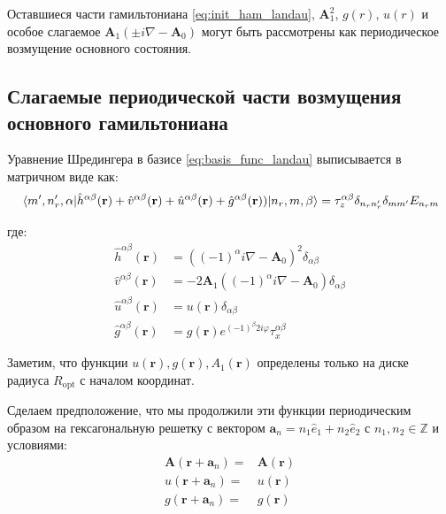 \documentclass[a4paper,article,14pt]{extarticle}
\begin{document}
Оставшиеся части гамильтониана \eqref{eq:init_ham_landau}, $\mathbf{A}_1^2$, $g(r)$, $u(r)$ и особое слагаемое 
$\mathbf{A}_1  (\pm i \nabla - \mathbf{A}_0 )$ могут быть рассмотрены как периодическое возмущение основного состояния.


\subsection{Слагаемые периодической части возмущения основного гамильтониана}

Уравнение Шредингера в базисе \eqref{eq:basis_func_landau} выписывается в матричном виде как:
\begin{equation}
\label{eq:shred_final}
\mel{m', n'_r, \alpha}{\hat h^{\alpha \beta}(\mathbf{r}) + \hat v^{\alpha \beta}(\mathbf{r}) + \hat u^{\alpha \beta}(\mathbf{r}) + \hat g^{\alpha \beta} (\mathbf{r})) }{n_r,m, \beta} = {\tau_z^{\alpha \beta} \delta_{n_r n'_r} \delta_{m m'} E_{n_r m} }
\end{equation}

\noindent где:
\begin{equation}
\label{eq:definitions}
\begin{aligned}
\hat h^{\alpha \beta}(\mathbf{r})   &= \left( (-1)^\alpha i \nabla - \mathbf{A}_0 \right) ^ 2 \delta_{\alpha \beta} \\
\hat v^{\alpha \beta}(\mathbf{r})   &= - 2 \mathbf{A}_1 \left( (-1)^{\alpha} i \nabla - \mathbf{A}_0 \right) \delta_{\alpha \beta} \\
\hat u^{\alpha \beta}(\mathbf{r})   &= u(\mathbf{r})  \delta_{\alpha \beta}\\
\hat g^{\alpha \beta} (\mathbf{r}) &=   g(\mathbf{r})  e^{ (-1)^{\beta} 2  i   \varphi} \tau^{\alpha \beta}_x 
\end{aligned}
\end{equation}

Заметим, что функции $u(\mathbf{r}), g(\mathbf{r}), A_1(\mathbf{r})$ определены только на диске радиуса $R_\text{opt}$ с началом координат.

Сделаем предположение, что мы продолжили эти функции периодическим образом на гексагональную решетку с вектором $\mathbf{a}_n = n_1 \hat {e}_1 + n_2 \hat {e}_2$ с $n_1,n_2 \in \mathbb{Z}$ и условиями:
\begin{equation}
\label{eq:periodic_potentials}
\begin{aligned}
\mathbf{A}(\mathbf{r} + \mathbf{a}_n) =& \mathbf{A}(\mathbf{r}) \\
u(\mathbf{r} + \mathbf{a}_n) =& u(\mathbf{r}) \\
g(\mathbf{r} + \mathbf{a}_n) =& g(\mathbf{r})
\end{aligned}
\end{equation}
\end{document}
